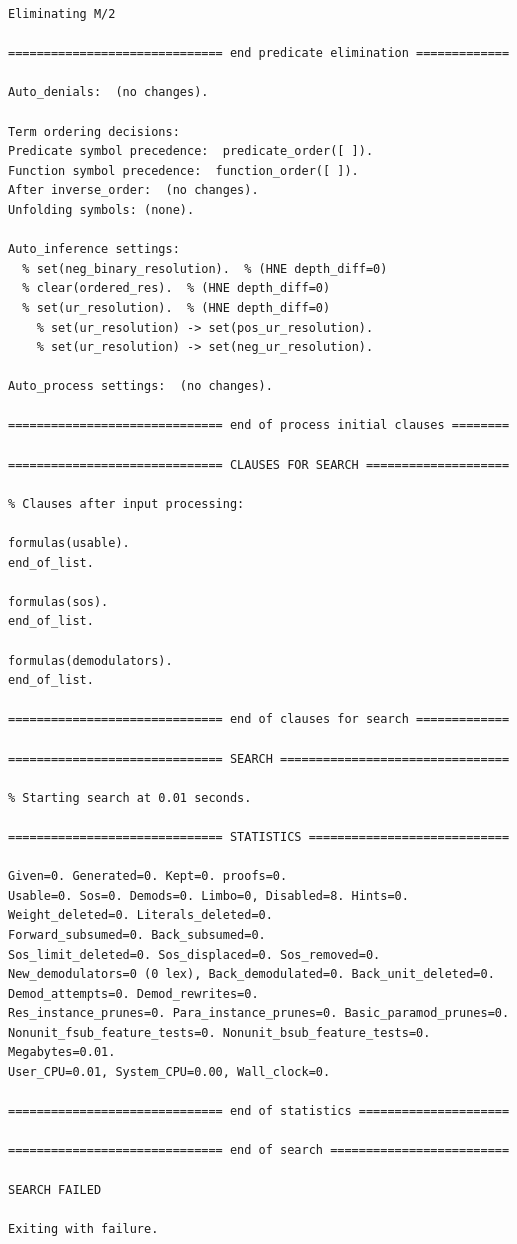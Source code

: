 \documentclass[fullpage]{article}
\begin{document}
{\begin{verbatim}
Eliminating M/2

============================== end predicate elimination =============

Auto_denials:  (no changes).

Term ordering decisions:
Predicate symbol precedence:  predicate_order([ ]).
Function symbol precedence:  function_order([ ]).
After inverse_order:  (no changes).
Unfolding symbols: (none).

Auto_inference settings:
  % set(neg_binary_resolution).  % (HNE depth_diff=0)
  % clear(ordered_res).  % (HNE depth_diff=0)
  % set(ur_resolution).  % (HNE depth_diff=0)
    % set(ur_resolution) -> set(pos_ur_resolution).
    % set(ur_resolution) -> set(neg_ur_resolution).

Auto_process settings:  (no changes).

============================== end of process initial clauses ========

============================== CLAUSES FOR SEARCH ====================

% Clauses after input processing:

formulas(usable).
end_of_list.

formulas(sos).
end_of_list.

formulas(demodulators).
end_of_list.

============================== end of clauses for search =============

============================== SEARCH ================================

% Starting search at 0.01 seconds.

============================== STATISTICS ============================

Given=0. Generated=0. Kept=0. proofs=0.
Usable=0. Sos=0. Demods=0. Limbo=0, Disabled=8. Hints=0.
Weight_deleted=0. Literals_deleted=0.
Forward_subsumed=0. Back_subsumed=0.
Sos_limit_deleted=0. Sos_displaced=0. Sos_removed=0.
New_demodulators=0 (0 lex), Back_demodulated=0. Back_unit_deleted=0.
Demod_attempts=0. Demod_rewrites=0.
Res_instance_prunes=0. Para_instance_prunes=0. Basic_paramod_prunes=0.
Nonunit_fsub_feature_tests=0. Nonunit_bsub_feature_tests=0.
Megabytes=0.01.
User_CPU=0.01, System_CPU=0.00, Wall_clock=0.

============================== end of statistics =====================

============================== end of search =========================

SEARCH FAILED

Exiting with failure.

\end{verbatim} }
\end{document}
